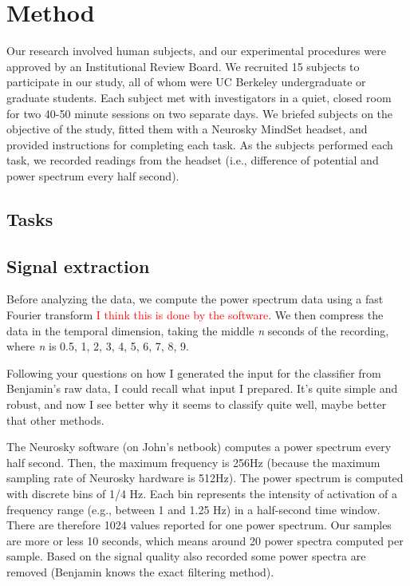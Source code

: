 \section{Method}

Our research involved human subjects, and our experimental procedures were approved by an Institutional Review Board. We recruited 15 subjects to participate in our study, all of whom were UC Berkeley undergraduate or graduate students. Each subject met with investigators in a quiet, closed room for two 40-50 minute sessions on two separate days. We briefed subjects on the objective of the study, fitted them with a Neurosky MindSet headset, and provided instructions for completing each task. As the subjects performed each task, we recorded readings from the headset (i.e., difference of potential and power spectrum every half second).

\subsection{Tasks}


\subsection{Signal extraction}

Before analyzing the data, we compute the power spectrum data using a fast Fourier transform \textcolor{red}{I think this is done by the software}. We then compress the data in the temporal dimension, taking the middle \textit{n} seconds of the recording, where \textit{n} is {0.5, 1, 2, 3, 4, 5, 6, 7, 8, 9}. 



Following your questions on how I generated the input for the classifier from Benjamin's raw data, I could recall what input I prepared. It's quite simple and robust, and now I see better why it seems to classify quite well, maybe better that other methods.

The Neurosky software (on John's netbook) computes a power spectrum every half second. Then, the maximum frequency is 256Hz (because the maximum sampling rate of Neurosky hardware is 512Hz). The power spectrum is computed with discrete bins of 1/4 Hz. Each bin represents the intensity of activation of a frequency range (e.g., between 1 and 1.25 Hz) in a half-second time window. There are therefore 1024 values reported for one power spectrum. Our samples are more or less 10 seconds, which means around 20 power spectra computed per sample. Based on the signal quality also recorded some power spectra are removed (Benjamin knows the exact filtering method).

